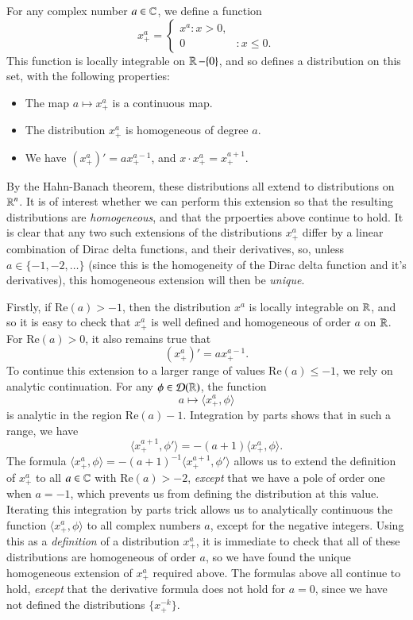 \begin{example}
    For any complex number $a \in \operatorname{\mathbb{C}}$, we define a function
    \[ x^a_+ = \begin{cases} x^a: x > 0, \\ 0 &: x \leq 0. \end{cases} \]
    This function is locally integrable on $\operatorname{\mathbb{R}} - \{ 0 \}$, and so defines a distribution on this set, with the following properties:
    \begin{itemize}
        \item The map $a \mapsto x^a_+$ is a continuous map.

        \item The distribution $x^a_+$ is homogeneous of degree $a$.

        \item We have $(x^a_+)' = a x^{a-1}_+$, and $x \cdot x^a_+ = x^{a+1}_+$.
    \end{itemize}
    By the Hahn-Banach theorem, these distributions all extend to distributions on $\operatorname{\mathbb{R}}^n$. It is of interest whether we can perform this extension so that the resulting distributions are \emph{homogeneous}, and that the prpoerties above continue to hold. It is clear that any two such extensions of the distributions $x^a_+$ differ by a linear combination of Dirac delta functions, and their derivatives, so, unless $a \in \{ -1, -2, \dots \}$ (since this is the homogeneity of the Dirac delta function and it's derivatives), this homogeneous extension will then be \emph{unique}.

    Firstly, if $\text{Re}(a) > -1$, then the distribution $x^a$ is locally integrable on $\operatorname{\mathbb{R}}$, and so it is easy to check that $x^a_+$ is well defined and homogeneous of order $a$ on $\operatorname{\mathbb{R}}$. For $\text{Re}(a) > 0$, it also remains true that
    \[ (x^a_+)' = a x^{a-1}_+. \]
    To continue this extension to a larger range of values $\text{Re}(a) \leq -1$, we rely on analytic continuation. For any $\phi \in \operatorname{\mathcal{D}}(\operatorname{\mathbb{R}})$, the function
    \[ a \mapsto \langle x^a_+, \phi \rangle \]
    is analytic in the region $\text{Re}(a) - 1$. Integration by parts shows that in such a range, we have
    \[ \langle x^{a+1}_+, \phi' \rangle = - (a+1) \langle x^a_+, \phi \rangle. \]
    The formula $\langle x^a_+, \phi \rangle = - (a+1)^{-1} \langle x^{a+1}_+, \phi' \rangle$ allows us to extend the definition of $x^a_+$ to all $a \in \operatorname{\mathbb{C}}$ with $\text{Re}(a) > -2$, \emph{except} that we have a pole of order one when $a = -1$, which prevents us from defining the distribution at this value. Iterating this integration by parts trick allows us to analytically continuous the function $\langle x^a_+, \phi \rangle$ to all complex numbers $a$, except for the negative integers. Using this as a \emph{definition} of a distribution $x^a_+$, it is immediate to check that all of these distributions are homogeneous of order $a$, so we have found the unique homogeneous extension of $x^a_+$ required above. The formulas above all continue to hold, \emph{except} that the derivative formula does not hold for $a = 0$, since we have not defined the distributions $\{ x^{-k}_+ \}$.


\end{example}
